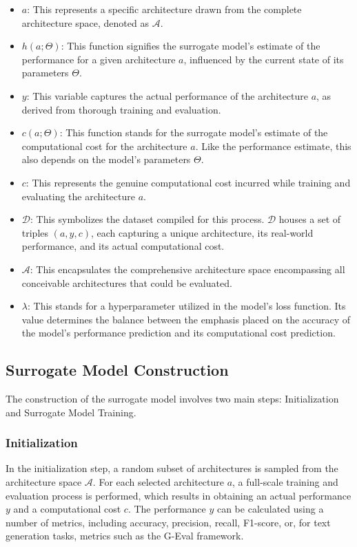 \documentclass{article}
\begin{document}
\begin{itemize}
\item $a$: This represents a specific architecture drawn from the complete architecture space, denoted as $\mathcal{A}$.
\item $h(a;\Theta)$: This function signifies the surrogate model's estimate of the performance for a given architecture $a$, influenced by the current state of its parameters $\Theta$.
\item $y$: This variable captures the actual performance of the architecture $a$, as derived from thorough training and evaluation.
\item $c(a;\Theta)$: This function stands for the surrogate model's estimate of the computational cost for the architecture $a$. Like the performance estimate, this also depends on the model's parameters $\Theta$.
\item $c$: This represents the genuine computational cost incurred while training and evaluating the architecture $a$.
\item $\mathcal{D}$: This symbolizes the dataset compiled for this process. $\mathcal{D}$ houses a set of triples $(a, y, c)$, each capturing a unique architecture, its real-world performance, and its actual computational cost.
\item $\mathcal{A}$: This encapsulates the comprehensive architecture space encompassing all conceivable architectures that could be evaluated.
\item $\lambda$: This stands for a hyperparameter utilized in the model's loss function. Its value determines the balance between the emphasis placed on the accuracy of the model's performance prediction and its computational cost prediction.
\end{itemize}

\subsection{Surrogate Model Construction}

The construction of the surrogate model involves two main steps: Initialization and Surrogate Model Training.

\subsubsection{Initialization}

In the initialization step, a random subset of architectures is sampled from the architecture space $\mathcal{A}$. For each selected architecture $a$, a full-scale training and evaluation process is performed, which results in obtaining an actual performance $y$ and a computational cost $c$. The performance $y$ can be calculated using a number of metrics, including accuracy, precision, recall, F1-score, or, for text generation tasks, metrics such as the G-Eval framework.
\end{document}

